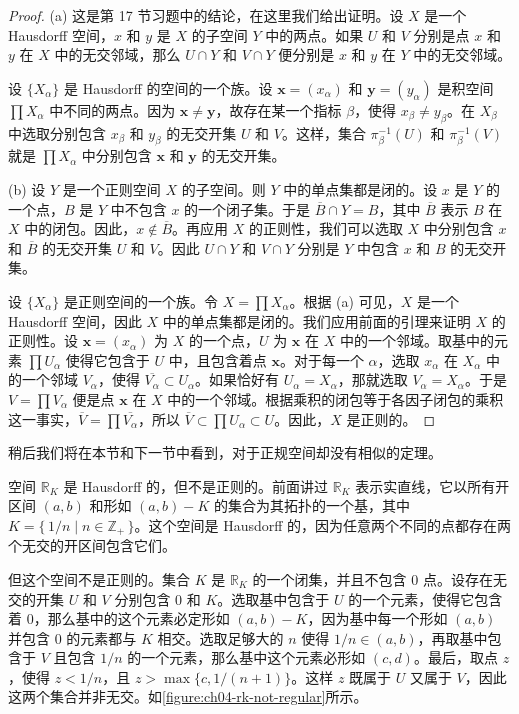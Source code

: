 \begin{proof}
(a) 这是第 17 节习题中的结论，在这里我们给出证明。设 $X$ 是一个 Hausdorff 空间，$x$ 和 $y$ 是 $X$ 的子空间 $Y$ 中的两点。如果 $U$ 和 $V$ 分别是点 $x$ 和 $y$ 在 $X$ 中的无交邻域，那么 $U\cap Y$ 和 $V\cap Y$ 便分别是 $x$ 和 $y$ 在 $Y$ 中的无交邻域。

设 $\{X_{\alpha}\}$ 是 Hausdorff 的空间的一个族。设 $\boldsymbol{x}=(x_{\alpha})$ 和 $\boldsymbol{y}=(y_{\alpha})$ 是积空间 $\prod X_{\alpha}$ 中不同的两点。因为 $\boldsymbol{x}\neq\boldsymbol{y}$，故存在某一个指标 $\beta$，使得 $x_{\beta}\neq y_{\beta}$。在 $X_{\beta}$ 中选取分别包含 $x_{\beta}$ 和 $y_{\beta}$ 的无交开集 $U$ 和 $V$。这样，集合 $\pi_{\beta}^{-1}(U)$ 和 $\pi_{\beta}^{-1}(V)$ 就是 $\prod X_{\alpha}$ 中分别包含 $\boldsymbol{x}$ 和 $\boldsymbol{y}$ 的无交开集。

(b) 设 $Y$ 是一个正则空间 $X$ 的子空间。则 $Y$ 中的单点集都是闭的。设 $x$ 是 $Y$ 的一个点，$B$ 是 $Y$ 中不包含 $x$ 的一个闭子集。于是 $\overline{B}\cap Y=B$，其中 $\overline{B}$ 表示 $B$ 在 $X$ 中的闭包。因此，$x\notin\overline{B}$。再应用 $X$ 的正则性，我们可以选取 $X$ 中分别包含 $x$ 和 $\overline{B}$ 的无交开集 $U$ 和 $V$。因此 $U\cap Y$ 和 $V\cap Y$ 分别是 $Y$ 中包含 $x$ 和 $B$ 的无交开集。

设 $\{X_{\alpha}\}$ 是正则空间的一个族。令 $X=\prod X_{\alpha}$。根据 (a) 可见，$X$ 是一个 Hausdorff 空间，因此 $X$ 中的单点集都是闭的。我们应用前面的引理来证明 $X$ 的正则性。设 $\boldsymbol{x}=(x_{\alpha})$ 为 $X$ 的一个点，$U$ 为 $\boldsymbol{x}$ 在 $X$ 中的一个邻域。取基中的元素 $\prod U_{\alpha}$ 使得它包含于 $U$ 中，且包含着点 $\boldsymbol{x}$。对于每一个 $\alpha$，选取 $x_{\alpha}$ 在 $X_{\alpha}$ 中的一个邻域 $V_{\alpha}$，使得 $\overline{V_{\alpha}}\subset U_{\alpha}$。如果恰好有 $U_{\alpha}=X_{\alpha}$，那就选取 $V_{\alpha}=X_{\alpha}$。于是 $V=\prod V_{\alpha}$ 便是点 $\boldsymbol{x}$ 在 $X$ 中的一个邻域。根据乘积的闭包等于各因子闭包的乘积这一事实，$\overline{V}=\prod\overline{V_{\alpha}}$，所以 $\overline{V}\subset\prod U_{\alpha}\subset U$。因此，$X$ 是正则的。
\end{proof}

稍后我们将在本节和下一节中看到，对于正规空间却没有相似的定理。

\begin{example}\label{example:ch04-rk-not-regular}
空间 $\mathbb{R}_{K}$ 是 Hausdorff 的，但不是正则的。前面讲过 $\mathbb{R}_{K}$ 表示实直线，它以所有开区间 $(a,b)$ 和形如 $(a,b)-K$ 的集合为其拓扑的一个基，其中 $K=\{\,1/n\mid n\in\mathbb{Z}_{+}\,\}$。这个空间是 Hausdorff 的，因为任意两个不同的点都存在两个无交的开区间包含它们。

但这个空间不是正则的。集合 $K$ 是 $\mathbb{R}_{K}$ 的一个闭集，并且不包含 $0$ 点。设存在无交的开集 $U$ 和 $V$ 分别包含 $0$ 和 $K$。选取基中包含于 $U$ 的一个元素，使得它包含着 $0$，那么基中的这个元素必定形如 $(a,b)-K$，因为基中每一个形如 $(a,b)$ 并包含 $0$ 的元素都与 $K$ 相交。选取足够大的 $n$ 使得 $1/n\in(a,b)$，再取基中包含于 $V$ 且包含 $1/n$ 的一个元素，那么基中这个元素必形如 $(c,d)$。最后，取点 $z$，使得 $z<1/n$，且 $z>\max\{c,1/(n+1)\}$。这样 $z$ 既属于 $U$ 又属于 $V$，因此这两个集合并非无交。如\cref{figure:ch04-rk-not-regular}所示。
\end{example}

